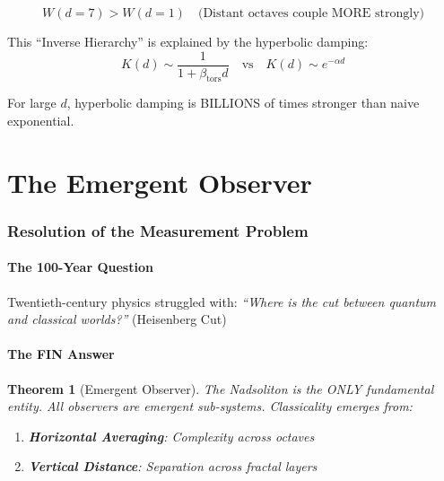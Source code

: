 \documentclass[11pt,a4paper]{book}
\newtheorem{theorem}{Theorem}[section]
\theoremstyle{remark}
\newcommand{\betators}{\beta_{\text{tors}}}
\begin{document}
\begin{equation}
W(d=7) > W(d=1) \quad \text{(Distant octaves couple MORE strongly)}
\end{equation}

This ``Inverse Hierarchy'' is explained by the hyperbolic damping:
\begin{equation}
K(d) \sim \frac{1}{1 + \betators d} \quad \text{vs} \quad K(d) \sim e^{-\alpha d}
\end{equation}

For large $d$, hyperbolic damping is BILLIONS of times stronger than naive exponential.

\newpage
\part{The Emergent Observer}

\section{Resolution of the Measurement Problem}

\subsection{The 100-Year Question}

Twentieth-century physics struggled with: \textit{``Where is the cut between quantum and classical worlds?''} (Heisenberg Cut)

\subsection{The FIN Answer}

\begin{theorem}[Emergent Observer]
The Nadsoliton is the ONLY fundamental entity. All observers are emergent sub-systems. Classicality emerges from:
\begin{enumerate}
    \item \textbf{Horizontal Averaging}: Complexity across octaves
    \item \textbf{Vertical Distance}: Separation across fractal layers
\end{enumerate}
\end{theorem}
\end{document}
